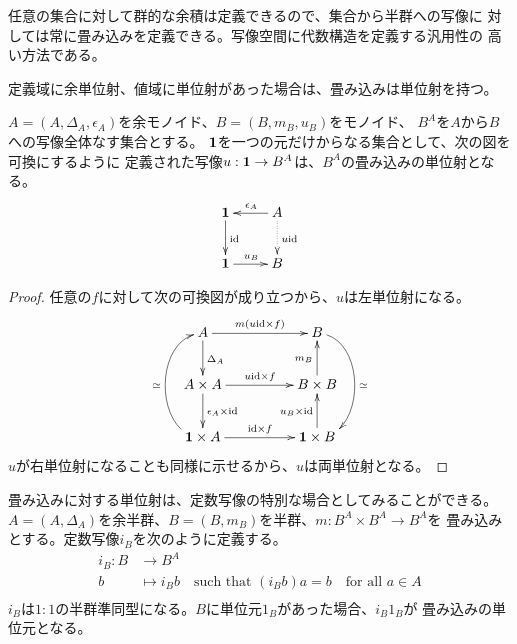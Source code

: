 	任意の集合に対して群的な余積は定義できるので、集合から半群への写像に
	対しては常に畳み込みを定義できる。写像空間に代数構造を定義する汎用性の
	高い方法である。
	
	定義域に余単位射、値域に単位射があった場合は、畳み込みは単位射を持つ。

	\begin{proposition}[畳み込みの単位射]\label{prop:畳み込みの単位射} %
		$A=(A,\Delta_A,\epsilon_A)$を余モノイド、$B=(B,m_B,u_B)$をモノイド、
		$B^A$を$A$から$B$への写像全体なす集合とする。
		${\mathbf{1}}$を一つの元だけからなる集合として、次の図を可換にするように
		定義された写像$u:{\mathbf{1}}\to B^A$は、$B^A$の畳み込みの単位射となる。
		\begin{equation}\xymatrix{
			\mybf{1} \ar[d]^{\myid} & A \ar[l]_{\epsilon_A} \ar@{.>}[d]^{u\myid} \\
			\mybf{1} \ar[r]^{u_B} & B \\
		}\end{equation}
	\end{proposition} %
	\begin{proof} %
		任意の$f$に対して次の可換図が成り立つから、$u$は左単位射になる。
		\begin{equation}\xymatrix@C+2pc{
			A \ar[d]^{\Delta_A} \ar[r]^{m(u\myid\times f)} & B \ar@(r,r)[dd]^{\simeq} \\
			A\times A \ar[d]^{\epsilon_A\times \myid} \ar[r]^{u\myid\times f} & B\times B \ar[u]^{m_B} \\
			\mybf{1}\times A \ar[r]^{\myid\times f} \ar@(l,l)[uu]^{\simeq} & \mybf{1}\times B \ar[u]^{u_B\times \myid} \\
		}\end{equation}
		$u$が右単位射になることも同様に示せるから、$u$は両単位射となる。
	\end{proof} %
	
	畳み込みに対する単位射は、定数写像の特別な場合としてみることができる。
	$A=(A,\Delta_A)$を余半群、$B=(B,m_B)$を半群、$m:B^A\times B^A\to B^A$を
	畳み込みとする。定数写像$i_B$を次のように定義する。
	\begin{equation}\label{eq:定数写像}\begin{split} %
		i_B: B&\to B^A \\
			b&\mapsto i_Bb \quad\text{such that }(i_Bb)a = b \quad\text{for all }a\in A \\
	\end{split}\end{equation} %
	$i_B$は$1:1$の半群準同型になる。$B$に単位元$1_B$があった場合、$i_B1_B$が
	畳み込みの単位元となる。

